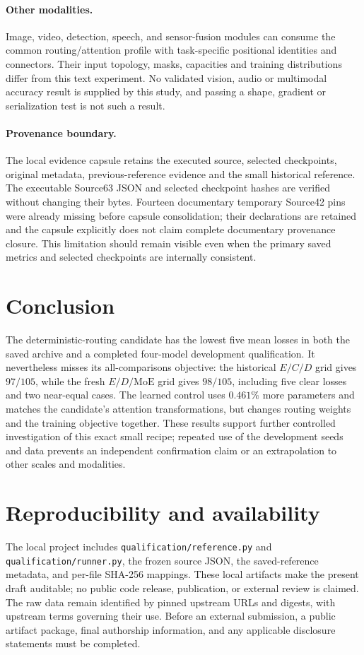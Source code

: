 \documentclass{article}
\begin{document}
\paragraph{Other modalities.}
Image, video, detection, speech, and sensor-fusion modules can consume the common routing/attention profile with task-specific positional identities and connectors. Their input topology, masks, capacities and training distributions differ from this text experiment. No validated vision, audio or multimodal accuracy result is supplied by this study, and passing a shape, gradient or serialization test is not such a result.

\paragraph{Provenance boundary.}
The local evidence capsule retains the executed source, selected checkpoints, original metadata, previous-reference evidence and the small historical reference. The executable Source63 JSON and selected checkpoint hashes are verified without changing their bytes. Fourteen documentary temporary Source42 pins were already missing before capsule consolidation; their declarations are retained and the capsule explicitly does not claim complete documentary provenance closure. This limitation should remain visible even when the primary saved metrics and selected checkpoints are internally consistent.

\section{Conclusion}
The deterministic-routing candidate has the lowest five mean losses in both the saved archive and a completed four-model development qualification. It nevertheless misses its all-comparisons objective: the historical $E/C/D$ grid gives $97/105$, while the fresh $E/D/\mathrm{MoE}$ grid gives $98/105$, including five clear losses and two near-equal cases. The learned control uses $0.461\%$ more parameters and matches the candidate's attention transformations, but changes routing weights and the training objective together. These results support further controlled investigation of this exact small recipe; repeated use of the development seeds and data prevents an independent confirmation claim or an extrapolation to other scales and modalities.

\section*{Reproducibility and availability}
The local project includes \texttt{qualification/reference.py} and \texttt{qualification/runner.py}, the frozen source JSON, the saved-reference metadata, and per-file SHA-256 mappings. These local artifacts make the present draft auditable; no public code release, publication, or external review is claimed. The raw data remain identified by pinned upstream URLs and digests, with upstream terms governing their use. Before an external submission, a public artifact package, final authorship information, and any applicable disclosure statements must be completed.
\end{document}
